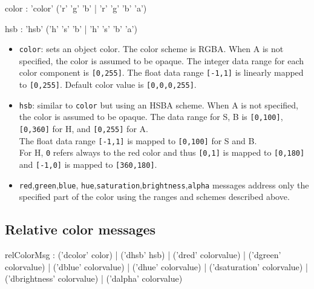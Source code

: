 \documentclass[a4paper,twoside]{report}
\newcommand{\subsublevel}[1]	{\subsection{#1}}
\newcommand{\OSC}[1]		{\texttt{#1}}
\newcommand{\values}[1]	{\texttt{#1}}
\begin{document}
\begin{rail}
color :		'color' ('r' 'g' 'b' | 'r' 'g' 'b' 'a') 
\end{rail}
\begin{rail}
hsb :		'hsb' ('h' 's' 'b' | 'h' 's' 'b' 'a') 
\end{rail}

\begin{itemize}
\item \OSC{color}: sets an object color. The color scheme is RGBA. When A is not specified, the color is assumed to be opaque. The integer data range for each color component is \values{[0,255]}. The float data range \values{[-1,1]} is linearly mapped to \values{[0,255]}. Default color value is \values{[0,0,0,255]}.
\item \OSC{hsb}: similar to \OSC{color} but using an HSBA scheme. When A is not specified, the color is assumed to be opaque. The data range for S, B is \values{[0,100]}, \values{[0,360]} for H, and \values{[0,255]} for A. \\
The float data range \values{[-1,1]} is mapped to \values{[0,100]} for S and B. \\
For H, \values{0} refers always to the red color and thus \values{[0,1]} is mapped to \values{[0,180]} and \values{[-1,0]} is mapped to \values{[360,180]}.
\item \OSC{red},\OSC{green},\OSC{blue}, \OSC{hue},\OSC{saturation},\OSC{brightness},\OSC{alpha} messages address only the specified part of the color using the ranges and schemes described above.
\end{itemize}

\subsublevel{Relative color messages}
\label{relcolormsg}

\begin{rail}
relColorMsg :  
		 	('dcolor' color) 
		| 	('dhsb' hsb) 
		| 	('dred' colorvalue) 
		| 	('dgreen' colorvalue) 
		| 	('dblue' colorvalue) 
		| 	('dhue' colorvalue) 
		| 	('dsaturation' colorvalue) 
		| 	('dbrightness' colorvalue) 
		| 	('dalpha' colorvalue) 
\end{rail}
\end{document}
